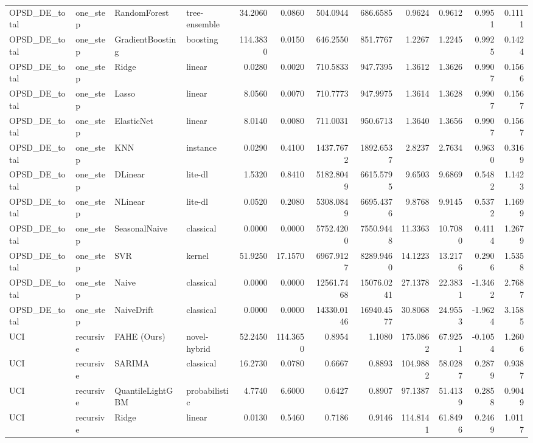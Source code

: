 \begin{tabular}{llllrrrrrrrr}
OPSD_DE_total & one_step & RandomForest & tree-ensemble & 34.2060 & 0.0860 & 504.0944 & 686.6585 & 0.9624 & 0.9612 & 0.9951 & 0.1111 \\
OPSD_DE_total & one_step & GradientBoosting & boosting & 114.3830 & 0.0150 & 646.2550 & 851.7767 & 1.2267 & 1.2245 & 0.9925 & 0.1424 \\
OPSD_DE_total & one_step & Ridge & linear & 0.0280 & 0.0020 & 710.5833 & 947.7395 & 1.3612 & 1.3626 & 0.9907 & 0.1566 \\
OPSD_DE_total & one_step & Lasso & linear & 8.0560 & 0.0070 & 710.7773 & 947.9975 & 1.3614 & 1.3628 & 0.9907 & 0.1567 \\
OPSD_DE_total & one_step & ElasticNet & linear & 8.0140 & 0.0080 & 711.0031 & 950.6713 & 1.3640 & 1.3656 & 0.9907 & 0.1567 \\
OPSD_DE_total & one_step & KNN & instance & 0.0290 & 0.4100 & 1437.7672 & 1892.6537 & 2.8237 & 2.7634 & 0.9630 & 0.3169 \\
OPSD_DE_total & one_step & DLinear & lite-dl & 1.5320 & 0.8410 & 5182.8049 & 6615.5795 & 9.6503 & 9.6869 & 0.5482 & 1.1423 \\
OPSD_DE_total & one_step & NLinear & lite-dl & 0.0520 & 0.2080 & 5308.0849 & 6695.4376 & 9.8768 & 9.9145 & 0.5372 & 1.1699 \\
OPSD_DE_total & one_step & SeasonalNaive & classical & 0.0000 & 0.0000 & 5752.4200 & 7550.9448 & 11.3363 & 10.7080 & 0.4114 & 1.2679 \\
OPSD_DE_total & one_step & SVR & kernel & 51.9250 & 17.1570 & 6967.9127 & 8289.9460 & 14.1223 & 13.2176 & 0.2906 & 1.5358 \\
OPSD_DE_total & one_step & Naive & classical & 0.0000 & 0.0000 & 12561.7468 & 15076.0241 & 27.1378 & 22.3831 & -1.3462 & 2.7687 \\
OPSD_DE_total & one_step & NaiveDrift & classical & 0.0000 & 0.0000 & 14330.0146 & 16940.4577 & 30.8068 & 24.9553 & -1.9624 & 3.1585 \\
UCI & recursive & FAHE (Ours) & novel-hybrid & 52.2450 & 114.3650 & 0.8954 & 1.1080 & 175.0862 & 67.9251 & -0.1054 & 1.2606 \\
UCI & recursive & SARIMA & classical & 16.2730 & 0.0780 & 0.6667 & 0.8893 & 104.9882 & 58.0287 & 0.2879 & 0.9387 \\
UCI & recursive & QuantileLightGBM & probabilistic & 4.7740 & 6.6000 & 0.6427 & 0.8907 & 97.1387 & 51.4139 & 0.2858 & 0.9049 \\
UCI & recursive & Ridge & linear & 0.0130 & 0.5460 & 0.7186 & 0.9146 & 114.8141 & 61.8496 & 0.2469 & 1.0117 \\

\end{tabular}
